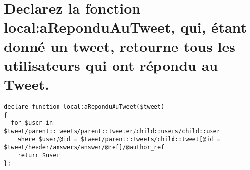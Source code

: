 \section{Declarez la fonction local:aReponduAuTweet, qui, étant donné un tweet, retourne tous les utilisateurs qui ont répondu au Tweet.}
\begin{verbatim}
declare function local:aReponduAuTweet($tweet)
{
  for $user in $tweet/parent::tweets/parent::tweeter/child::users/child::user
    where $user/@id = $tweet/parent::tweets/child::tweet[@id = $tweet/header/answers/answer/@ref]/@author_ref
    return $user
};
\end{verbatim}
